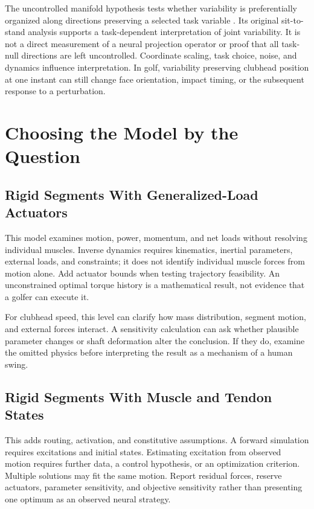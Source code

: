 The uncontrolled manifold hypothesis tests whether variability is preferentially
organized along directions preserving a selected task variable
\cite{ScholzSchoner1999}. Its original sit-to-stand analysis supports a
task-dependent interpretation of joint variability. It is not a direct
measurement of a neural projection operator or proof that all task-null
directions are left uncontrolled. Coordinate scaling, task choice, noise,
and dynamics influence interpretation. In golf, variability preserving
clubhead position at one instant can still change face orientation, impact
timing, or the subsequent response to a perturbation.

\section{Choosing the Model by the Question}
\subsection{Rigid Segments With Generalized-Load Actuators}

This model examines motion, power, momentum, and net loads without resolving
individual muscles. Inverse dynamics requires kinematics, inertial parameters,
external loads, and constraints; it does not identify individual muscle forces
from motion alone. Add actuator bounds when testing trajectory feasibility.
An unconstrained optimal torque history is a mathematical result, not evidence
that a golfer can execute it.

For clubhead speed, this level can clarify how mass distribution, segment
motion, and external forces interact. A sensitivity calculation can ask
whether plausible parameter changes or shaft deformation alter the conclusion.
If they do, examine the omitted physics before interpreting the result as a
mechanism of a human swing.

\subsection{Rigid Segments With Muscle and Tendon States}

This adds routing, activation, and constitutive assumptions. A forward
simulation requires excitations and initial states. Estimating excitation
from observed motion requires further data, a control hypothesis, or an
optimization criterion. Multiple solutions may fit the same motion. Report
residual forces, reserve actuators, parameter sensitivity, and objective
sensitivity rather than presenting one optimum as an observed neural strategy.

